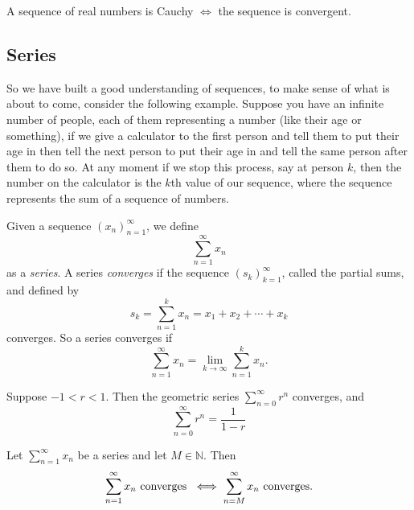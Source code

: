 \documentclass[../main.tex]{subfiles}
\begin{document}
    
    
    \begin{theorem}\label{thm:cauchy_convergence}
    A sequence of real numbers is Cauchy $ \iff$ the sequence is convergent. 
        
    \end{theorem}
    
    
    \subsection{Series}
    \par So we have built a good understanding of sequences, to make sense of what is about to come, consider the following example. Suppose you have an infinite number of people, each of them representing a number (like their age or something), if we give a calculator to the first person and tell them to put their age in then tell the next person to put their age in and tell the same person after them to do so. At any moment if we stop this process, say at person $k$, then the number on the calculator is the $k$th value of our sequence, where the sequence represents the sum of a sequence of numbers. 
    
    \begin{definition}[Series]\label{def:series}
    Given a sequence $ (x_n)^\infty_{n=1}$, we define
    \[
    \sum_{n=1}^\infty{x_n}
    \]
    as a \textit{series}. A series \textit{converges} if the sequence $ (s_k)^\infty_{k=1}$, called the partial sums, and defined by
    \[
    s_k = \sum_{n = 1}^k{x_n} = x_1 + x_2 + \cdots + x_k
    \]
    converges. So a series converges if
    \[
    \sum_{n=1}^\infty{x_n} = \lim_{k \to \infty}{\sum_{n = 1}^k{x_n}}.
    \]
    \end{definition}
    
    
    
    
    
    \begin{proposition}\label{prp:geo_series}
    Suppose $ -1 < r < 1.$ Then the geometric series $ \sum_{n=0}^\infty{r^n}$ converges, and 
    \[
    \sum_{n=0}^\infty{r^n} = \frac{1}{1-r}
    \]
    \end{proposition}
    
    
    
    
    
    
    \begin{exercise}
    Let $\sum_{n=1}^\infty{x_n}$ be a series and let $M \in \mathbb{N}$. Then
    \[
    \sum_{n=1}^\infty{x_n} \textnormal{ converges } \iff \sum_{n=M}^\infty{x_n} \textnormal{ converges.}
    \]
    \end{exercise}
    
\end{document}
